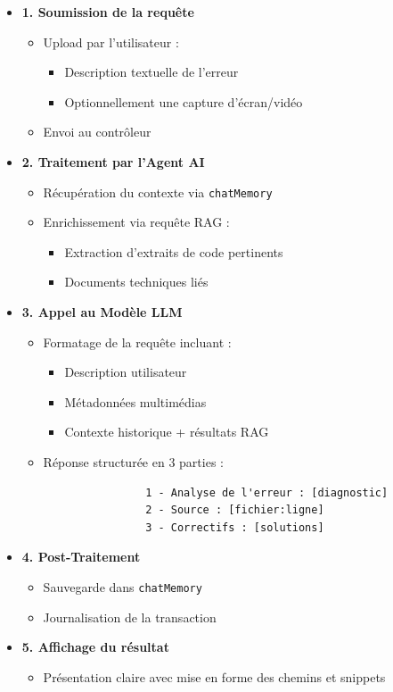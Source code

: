 \documentclass[12pt,a4paper]{report}
\begin{document}
	\begin{itemize}[label={}]
		\item \textbf{1. Soumission de la requête}
		\begin{itemize}
			\item Upload par l'utilisateur :
			\begin{itemize}
				\item Description textuelle de l'erreur
				\item Optionnellement une capture d'écran/vidéo
			\end{itemize}
			\item Envoi au contrôleur
		\end{itemize}
		
		\item \textbf{2. Traitement par l'Agent AI}
		\begin{itemize}
			\item Récupération du contexte via \texttt{chatMemory}
			\item Enrichissement via requête RAG :
			\begin{itemize}
				\item Extraction d'extraits de code pertinents
				\item Documents techniques liés
			\end{itemize}
		\end{itemize}
		
		\item \textbf{3. Appel au Modèle LLM}
		\begin{itemize}
			\item Formatage de la requête incluant :
			\begin{itemize}
				\item Description utilisateur
				\item Métadonnées multimédias
				\item Contexte historique + résultats RAG
			\end{itemize}
			\item Réponse structurée en 3 parties :
			\begin{verbatim}
				1 - Analyse de l'erreur : [diagnostic]
				2 - Source : [fichier:ligne]
				3 - Correctifs : [solutions]
			\end{verbatim}
		\end{itemize}
		
		\item \textbf{4. Post-Traitement}
		\begin{itemize}
			\item Sauvegarde dans \texttt{chatMemory}
			\item Journalisation de la transaction
		\end{itemize}
		
		\item \textbf{5. Affichage du résultat}
		\begin{itemize}
			\item Présentation claire avec mise en forme des chemins et snippets
		\end{itemize}
	\end{itemize}
	
\end{document}
